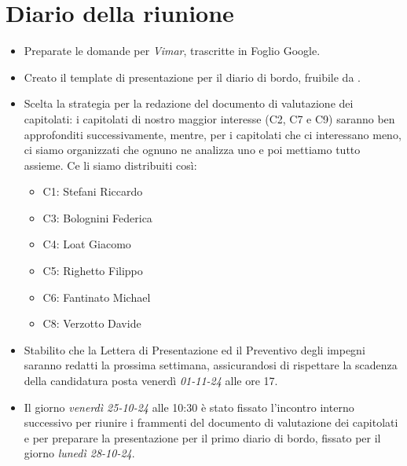 \section{Diario della riunione}

\begin{itemize}
    \item Preparate le domande per \emph{Vimar}, trascritte in  Foglio Google.
    
    \item Creato il template di presentazione per il diario di bordo, fruibile da .
    
    \item Scelta la strategia per la redazione del documento di valutazione dei capitolati: i capitolati di nostro maggior interesse (C2, C7 e C9) saranno ben approfonditi 
    successivamente, mentre, per i capitolati che ci interessano meno, ci siamo organizzati che ognuno ne analizza uno e poi mettiamo tutto assieme. Ce li siamo distribuiti così:
    \begin{itemize}
        \renewcommand{\labelitemii}{--}
        \item C1: Stefani Riccardo
        \item C3: Bolognini Federica
        \item C4: Loat Giacomo
        \item C5: Righetto Filippo
        \item C6: Fantinato Michael
        \item C8: Verzotto Davide
    \end{itemize}

    \item Stabilito che la Lettera di Presentazione ed il Preventivo degli impegni saranno redatti la prossima settimana, assicurandosi di rispettare la scadenza della candidatura posta venerdì \emph{01-11-24} alle ore 17.

    \item Il giorno \emph{venerdì 25-10-24} alle 10:30 è stato fissato l'incontro interno successivo per riunire i frammenti del documento di valutazione dei capitolati e per preparare la presentazione per il primo diario di bordo, fissato per il giorno \emph{lunedì 28-10-24}.
\end{itemize}
